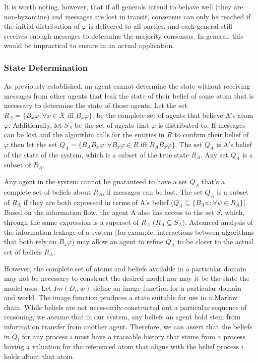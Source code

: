It is worth noting, however, that if all generals intend to behave well (they are non-byzantine) and messages are lost in transit, consensus can only be reached if the initial distribution of $\varphi$ is delivered to all parties, and each general still receives enough messages to determine the majority consensus. In general, this would be impractical to ensure in an actual application.

\subsubsection{State Determination}

As previously established, an agent cannot determine the state without receiving messages from other agents that leak the state of their belief of some atom that is necessary to determine the state of those agents. Let the set $R_A = \{ B_x \varphi : \forall x \in X \text{ iff } B_x \varphi \}$, be the complete set of agents that believe A's atom $\varphi$. Additionally, let $S_A$ be the set of agents that $\varphi$ is distributed to. If messages can be lost and the algorithm calls for the entities in $R$ to confirm their belief of $\varphi$ then let the set $Q_A = \{ B_A B_x \varphi : \forall B_x \varphi \in R \text{ iff } B_A B_x \varphi \}$. The set $Q_A$ is A's belief of the state of the system, which is a subset of the true state $R_A$. Any set $Q_A$ is a subset of $R_A$.

Any agent in the system cannot be guaranteed to have a set $Q_A$ that's a complete set of beliefs about $R_A$, if messages can be lost. The set $Q_A$ is a subset of $R_A$ if they are both expressed in terms of A's belief ($Q_A \subseteq \{ B_A \psi : \forall \psi \in R_A \}$). Based on the information flow, the agent A also has access to the set $S$, which, through the same expression is a superset of $R_A$ ($R_A \subseteq S_A$). Advanced analysis of the information leakage of a system (for example, interactions between algorithms that both rely on $B_x \varphi$) may allow an agent to refine $Q_A$ to be closer to the actual set of beliefs $R_A$.

However, the complete set of atoms and beliefs available in a particular domain may not be necessary to construct the desired model nor may it be the state the model uses. Let $Im(D_i, w)$ define an image function for a particular domain and world. The image function produces a state suitable for use in a Markov chain. While beliefs are not necessarily constructed out a particular sequence of reasoning, we assume that in our system, any beliefs an agent hold stem from information transfer from another agent. Therefore, we can assert that the beliefs in $Q_i$ for any process $i$ must have a traceable history that stems from a process having a valuation for the referenced atom that aligns with the belief process $i$ holds about that atom.


